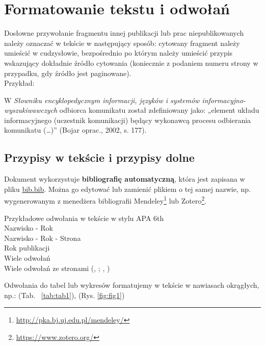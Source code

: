 \documentclass[twoside,a4paper,12pt]{report} %
\theoremstyle{break}
\begin{document}
\chapter{Formatowanie tekstu i odwołań}

Dosłowne przywołanie fragmentu innej publikacji lub prac niepublikowanych należy oznaczać w tekście w następujący sposób: cytowany fragment należy umieścić w cudzysłowie, bezpośrednio po którym należy umieścić przypis wskazujący dokładnie źródło cytowania (koniecznie z podaniem numeru strony w przypadku, gdy źródło jest paginowane).\\
Przykład: \par
\sloppy%
W {\it Słowniku encyklopedycznym informacji, języków i systemów  informacyjno-wyszukiwawczych} odbiorca komunikatu został zdefiniowany jako: „element układu informacyjnego (uczestnik komunikacji) będący wykonawcą procesu odbierania komunikatu (…)” (Bojar oprac., 2002, s. 177).

\section{Przypisy w tekście i przypisy dolne}

Dokument wykorzystuje {\bf bibliografię automatyczną}, która jest zapisana w pliku \underline{bib.bib}. Można go edytować lub zamienić plikiem o tej samej nazwie, np. wygenerowanym z menedżera bibliografii Mendeley\footnote{\url{http://pka.bj.uj.edu.pl/mendeley/}} lub Zotero\footnote{\url{https://www.zotero.org/}}.\par \bigskip

Przykładowe odwołania w tekście w stylu APA 6th\\
Nazwisko - Rok \citep{Cheuk1998}\\
Nazwisko - Rok - Strona \citep[s. 77]{Collins2010}\\
Rok publikacji \citeyearpar{Choo2013}\\
Wiele odwołań \citep{Ginman1987,Oliver2008}\\
Wiele odwołań ze stronami (\citeauthor{Deja2017}, \citeyear[s. 5]{Deja2017}; \citeauthor{Choo2013}, \citeyear[s. 766]{Choo2013})\par \bigskip

Odwołania do tabel lub wykresów formatujemy w tekście w nawiasach okrągłych, np.: (Tab. ~\ref{tab:tab1}), (Rys. \ref{fig:fig1})


\newpage
\end{document}
